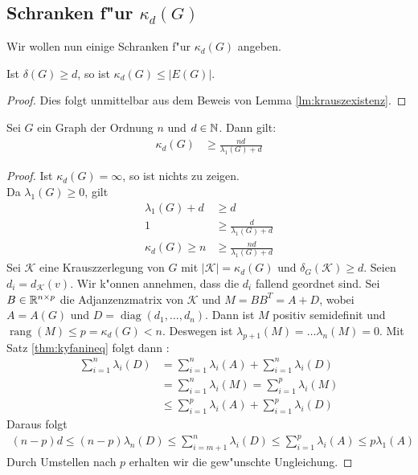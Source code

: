 \subsection{Schranken f"ur $\kappa_d(G)$}

Wir wollen nun einige Schranken f"ur $\kappa_{d}(G)$ angeben. 
\begin{lemma}
  Ist $\delta(G) \geq d$, so ist $\kappa_{d}(G) \leq |E(G)|$. 
\end{lemma}
\begin{proof}
  Dies folgt unmittelbar aus dem Beweis von Lemma \ref{lm:krauszexistenz}. 
\end{proof}

\begin{theorem}
  Sei $G$ ein Graph der Ordnung $n$ und $d\in {\mathbb{N}}$. Dann gilt:
  \begin{align*}
    \kappa_{d}(G) &\geq \frac{nd}{\lambda_{1}(G) +d} 
  \end{align*}
  \label{thm:kappaineq1}
\end{theorem}

\begin{proof}
  Ist $\kappa_{d}(G) = \infty$, so ist nichts zu zeigen. \\
   Da $\lambda_{1}(G) \geq 0$, gilt 
  \begin{align*}
    \lambda_{1}(G) + d &\geq d \\
    1 &\geq \frac{d}{\lambda_{1}(G) + d }\\
    \kappa_{d}(G) \geq n &\geq \frac{nd}{\lambda_{1}(G)+d}
  \end{align*}
  Sei $\mathcal{K}$ eine Krauszzerlegung von $G$ mit $|\mathcal{K}| = \kappa_{d}(G)$ und $\delta_{G}(\mathcal{K}) \geq d$. Seien $d_{i} = d_{\mathcal{K}}(v)$. Wir k"onnen annehmen, dass die $d_{i}$ fallend geordnet sind. Sei $B\in {\mathbb{R}}^{n\times p}$ die Adjanzenzmatrix von $\mathcal{K}$ und $M = BB^{T} = A+D$, wobei $A= A(G)$ und $D = \operatorname{diag}(d_{1},\dots,d_n)$.
  Dann ist $M$ positiv semidefinit und $\operatorname{rang} (M) \leq p = \kappa_{d}(G) < n $. Deswegen ist $\lambda_{p+1}(M) = \dots \lambda_{n}(M) = 0$. 
  Mit Satz \ref{thm:kyfanineq} folgt dann : 
  \begin{align*}
    \sum\limits_{i=1}^{n} \lambda_{i}(D) &=\sum\limits_{i=1}^{n} \lambda_{i}(A) +\sum\limits_{i=1}^{n}  \lambda_{i}(D) \\
    &=\sum\limits_{i=1}^{n} \lambda_{i}(M) =\sum\limits_{i=1}^{p} \lambda_{i}(M) \\
    &\leq \sum\limits_{i=1}^{p} \lambda_{i}(A) +\sum\limits_{i=1}^{p} \lambda_{i}(D)
  \end{align*}
  Daraus folgt 
  \begin{align*}
    (n-p) d \leq (n-p) \lambda_n(D) \leq \sum\limits_{i=m+1}^{n} \lambda_{i}(D) \leq\sum\limits_{i=1}^{p} \lambda_{i}(A) \leq p\lambda_{1}(A)
  \end{align*}
  Durch Umstellen nach $p$ erhalten wir die gew"unschte Ungleichung.
\end{proof}

